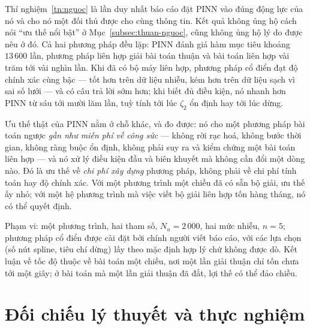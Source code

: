 \begin{nhanxet}
\label{nx:doc-tn11}
Thí nghiệm~\ref{tn:nguoc} là lần duy nhất báo cáo đặt PINN vào đúng động lực của
nó và cho nó một đối thủ được cho cùng thông tin. Kết quả không ủng hộ cách nói
``ưu thế nổi bật'' ở Mục~\ref{subsec:thuan-nguoc}, cũng không ủng hộ lý do được
nêu ở đó. Cả hai phương pháp đều lặp: PINN đánh giá hàm mục tiêu khoảng
$13\,600$ lần, phương pháp liên hợp giải bài toán thuận và bài toán liên hợp vài
trăm tới vài nghìn lần. Khi đã có bộ máy liên hợp, phương pháp cổ điển đạt độ
chính xác cùng bậc --- tốt hơn trên dữ liệu nhiễu, kém hơn trên dữ liệu sạch vì
sai số lưới --- và có câu trả lời sớm hơn; khi biết đủ điều kiện, nó nhanh hơn
PINN từ sáu tới mười lăm lần, tuỳ tính tới lúc $\zeta_2$ ổn định hay tới lúc
dừng.

Ưu thế thật của PINN nằm ở chỗ khác, và đo được: nó cho một phương pháp bài toán
ngược \emph{gần như miễn phí về công sức} --- không rời rạc hoá, không bước thời
gian, không ràng buộc ổn định, không phải suy ra và kiểm chứng một bài toán liên
hợp --- và nó xử lý điều kiện đầu và biên khuyết mà không cần đổi một dòng nào.
Đó là ưu thế về \emph{chi phí xây dựng} phương pháp, không phải về chi phí tính
toán hay độ chính xác. Với một phương trình một chiều đã có sẵn bộ giải, ưu thế
ấy nhỏ; với một hệ phương trình mà việc viết bộ giải liên hợp tốn hàng tháng,
nó có thể quyết định.

Phạm vi: một phương trình, hai tham số, $N_u = 2\,000$, hai mức nhiễu, $n = 5$;
phương pháp cổ điển được cài đặt bởi chính người viết báo cáo, với các lựa chọn
(số nút spline, tiêu chí dừng) lấy theo mặc định hợp lý chứ không được dò. Kết
luận về tốc độ thuộc về bài toán một chiều, nơi một lần giải thuận chỉ tốn chưa
tới một giây; ở bài toán mà một lần giải thuận đã đắt, lợi thế có thể đảo chiều.
\end{nhanxet}

\section{Đối chiếu lý thuyết và thực nghiệm}
\label{sec:doi-chieu}
 
